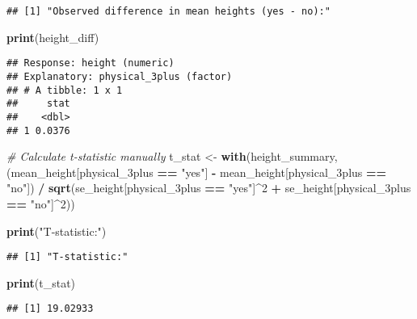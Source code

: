 \documentclass[
]{article}
\newenvironment{Shaded}{\begin{snugshade}}{\end{snugshade}}
\newcommand{\CommentTok}[1]{\textcolor[rgb]{0.56,0.35,0.01}{\textit{#1}}}
\newcommand{\DecValTok}[1]{\textcolor[rgb]{0.00,0.00,0.81}{#1}}
\newcommand{\FunctionTok}[1]{\textcolor[rgb]{0.13,0.29,0.53}{\textbf{#1}}}
\newcommand{\NormalTok}[1]{#1}
\newcommand{\OtherTok}[1]{\textcolor[rgb]{0.56,0.35,0.01}{#1}}
\newcommand{\SpecialCharTok}[1]{\textcolor[rgb]{0.81,0.36,0.00}{\textbf{#1}}}
\newcommand{\StringTok}[1]{\textcolor[rgb]{0.31,0.60,0.02}{#1}}
\begin{document}
\begin{verbatim}
## [1] "Observed difference in mean heights (yes - no):"
\end{verbatim}

\begin{Shaded}
\begin{Highlighting}[]
\FunctionTok{print}\NormalTok{(height\_diff)}
\end{Highlighting}
\end{Shaded}

\begin{verbatim}
## Response: height (numeric)
## Explanatory: physical_3plus (factor)
## # A tibble: 1 x 1
##     stat
##    <dbl>
## 1 0.0376
\end{verbatim}

\begin{Shaded}
\begin{Highlighting}[]
\CommentTok{\# Calculate t{-}statistic manually}
\NormalTok{t\_stat }\OtherTok{\textless{}{-}} \FunctionTok{with}\NormalTok{(height\_summary, }
\NormalTok{               (mean\_height[physical\_3plus }\SpecialCharTok{==} \StringTok{"yes"}\NormalTok{] }\SpecialCharTok{{-}}\NormalTok{ mean\_height[physical\_3plus }\SpecialCharTok{==} \StringTok{"no"}\NormalTok{]) }\SpecialCharTok{/} 
               \FunctionTok{sqrt}\NormalTok{(se\_height[physical\_3plus }\SpecialCharTok{==} \StringTok{"yes"}\NormalTok{]}\SpecialCharTok{\^{}}\DecValTok{2} \SpecialCharTok{+}\NormalTok{ se\_height[physical\_3plus }\SpecialCharTok{==} \StringTok{"no"}\NormalTok{]}\SpecialCharTok{\^{}}\DecValTok{2}\NormalTok{))}

\FunctionTok{print}\NormalTok{(}\StringTok{"T{-}statistic:"}\NormalTok{)}
\end{Highlighting}
\end{Shaded}

\begin{verbatim}
## [1] "T-statistic:"
\end{verbatim}

\begin{Shaded}
\begin{Highlighting}[]
\FunctionTok{print}\NormalTok{(t\_stat)}
\end{Highlighting}
\end{Shaded}

\begin{verbatim}
## [1] 19.02933
\end{verbatim}
\end{document}
